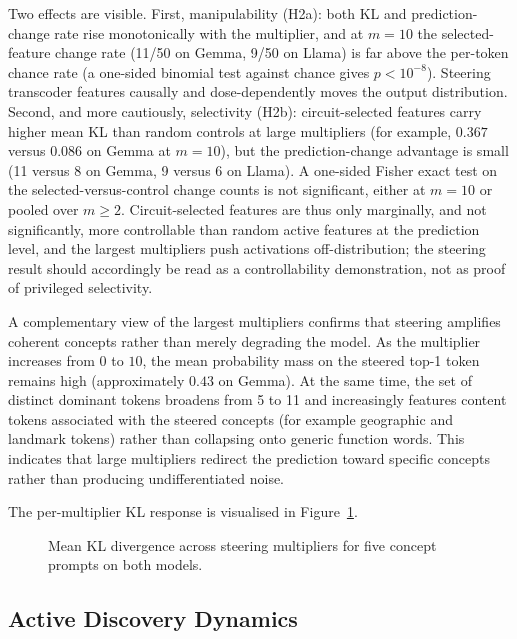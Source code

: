 Two effects are visible.  First, manipulability (H2a): both KL
and prediction-change rate rise monotonically with the multiplier, and
at $m{=}10$ the selected-feature change rate (11/50 on Gemma, 9/50 on
Llama) is far above the per-token chance rate (a one-sided binomial
test against chance gives $p<10^{-8}$).  Steering transcoder features
causally and dose-dependently moves the output distribution.
Second, and more cautiously, selectivity (H2b): circuit-selected
features carry higher mean KL than random controls at large
multipliers (for example, $0.367$ versus $0.086$ on Gemma at $m{=}10$), but the
prediction-change advantage is small (11 versus 8 on Gemma, 9
versus 6 on Llama).  A one-sided Fisher exact test on the
selected-versus-control change counts is not significant, either at
$m{=}10$ or pooled over $m\geq 2$.  Circuit-selected features are thus only
marginally, and not significantly, more controllable than random
active features at the prediction level, and the largest
multipliers push activations off-distribution; the steering result
should accordingly be read as a controllability demonstration, not as proof of
privileged selectivity.

A complementary view of the largest multipliers confirms that steering
amplifies coherent concepts rather than merely degrading the model. As
the multiplier increases from $0$ to $10$, the mean probability mass on
the steered top-1 token remains high (approximately $0.43$ on Gemma).
At the same time, the set of distinct dominant tokens broadens from 5 to 11 and
increasingly features content tokens associated with the steered
concepts (for example geographic and landmark tokens) rather than
collapsing onto generic function words. This indicates that large
multipliers redirect the prediction toward specific concepts rather than
producing undifferentiated noise.

The per-multiplier KL response is visualised in
Figure~\ref{fig:steering}.

\begin{figure}[H]
\centering

\caption{Mean KL divergence across steering multipliers for five
concept prompts on both models.}
\label{fig:steering}
\end{figure}

\subsection{Active Discovery Dynamics}
\label{sec:dynamics}

